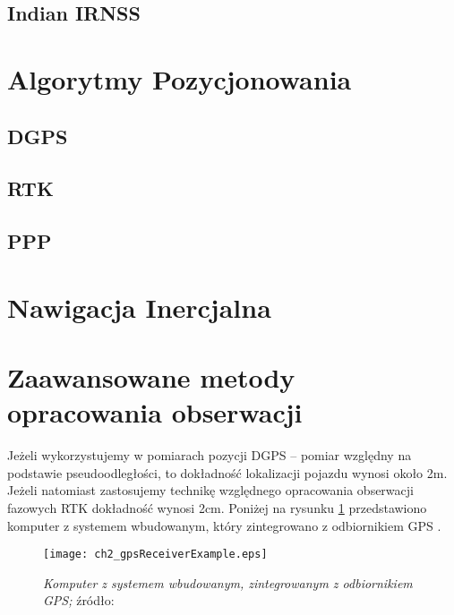 	\subsection{Indian IRNSS}
\section{Algorytmy Pozycjonowania}
	\subsection{DGPS}
	\subsection{RTK}
	\subsection{PPP}
\section{Nawigacja Inercjalna}
\section{Zaawansowane metody opracowania obserwacji}

\noindent
Jeżeli wykorzystujemy w pomiarach pozycji DGPS – pomiar względny na podstawie pseudoodległości,
to dokładność lokalizacji pojazdu wynosi około 2m. 
Jeżeli natomiast zastosujemy technikę względnego opracowania obserwacji fazowych RTK dokładność wynosi 2cm.
Poniżej na rysunku \ref{fig:ch2_gpsReceiverExample} przedstawiono komputer z systemem wbudowanym,
który zintegrowano z odbiornikiem GPS \cite{CCTA_951_958}.
\begin{figure}[H]
\centering
\texttt{[image: ch2\_gpsReceiverExample.eps]}
\caption{\textit{Komputer z systemem wbudowanym, zintegrowanym z odbiornikiem GPS;} źródło: \cite[][strona 952]{CCTA_951_958}}
\label{fig:ch2_gpsReceiverExample}
\end{figure}
\noindent
